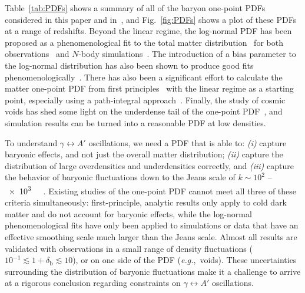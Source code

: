 \documentclass[prd,aps,10pt,nofootinbib,twocolumn,superscriptaddress,preprintnumbers,balancelastpage,longbibliography]{revtex4-1}
\begin{document}
Table~\ref{tab:PDFs} shows a summary of all of the baryon one-point PDFs considered in this paper and in~, and Fig.~\ref{fig:PDFs} shows a plot of these PDFs at a range of redshifts.  Beyond the linear regime, the log-normal PDF has been proposed as a phenomenological fit to the total matter distribution~\cite{1934ApJ....79....8H,Coles:1991if} for both observations~\cite{Clerkin:2016kyr,Gruen:2017xjj,Wild:2004me,Hurtado-Gil:2017dbm} and $N$-body simulations~\cite{Kofman:1993mx,Kayo:2001gu,Klypin:2017jjg}. 
The introduction of a bias parameter to the log-normal distribution has also been shown to produce good fits phenomenologically~\cite{Wild:2004me,Hurtado-Gil:2017dbm}.
There has also been a significant effort to calculate the matter one-point PDF from first principles~\cite{Bernardeau:1992zw,Bernardeau:2001qr} with the linear regime as a starting point, especially using a path-integral approach~\cite{Valageas:2001zr,Valageas:2001td,Matarrese:2000iz,Ivanov:2018lcg}. 
Finally, the study of cosmic voids has shed some light on the underdense tail of the one-point PDF~\cite{Zeldovich:1982zz,Plionis:2001gr,Einasto:2011eu,Jennings:2013nsa,Chan:2014qka,Adermann:2018jba}, and simulation results can be turned into a reasonable PDF at low densities.

To understand $\gamma \leftrightarrow A'$ oscillations, we need a PDF that is able to: \emph{(i)} capture baryonic effects, and not just the overall matter distribution; \emph{(ii)} capture the distribution of large overdensities and underdensities correctly, and \emph{(iii)} capture the behavior of baryonic fluctuations down to the Jeans scale of $k \sim 10^2$ -- \SI{e3}{\per\mega\parsec}. 
Existing studies of the one-point PDF cannot meet all three of these criteria simultaneously: first-principle, analytic results only apply to cold dark matter and do not account for baryonic effects, while the log-normal phenomenological fits have only been applied to simulations or data that have an effective smoothing scale much larger than the Jeans scale. 
Almost all results are validated with observations in a small range of density fluctuations ($10^{-1} \lesssim 1+\delta_\text{b} \lesssim 10$), or on one side of the PDF (\emph{e.g.},\ voids). These uncertainties surrounding the distribution of baryonic fluctuations make it a challenge to arrive at a rigorous conclusion regarding constraints on $\gamma \leftrightarrow A'$ oscillations.
\end{document}
